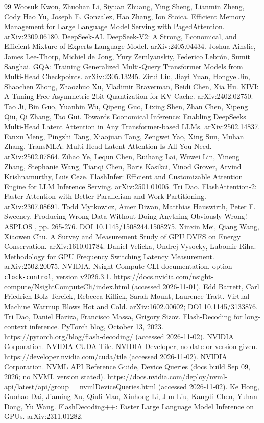 \documentclass[conference]{IEEEtran}
\begin{document}
\begin{thebibliography}{99}
 Woosuk Kwon, Zhuohan Li, Siyuan Zhuang, Ying Sheng, Lianmin Zheng, Cody Hao Yu, Joseph E. Gonzalez, Hao Zhang, Ion Stoica. Efficient Memory Management for Large Language Model Serving with PagedAttention. arXiv:2309.06180.
 DeepSeek-AI. DeepSeek-V2: A Strong, Economical, and Efficient Mixture-of-Experts Language Model. arXiv:2405.04434.
 Joshua Ainslie, James Lee-Thorp, Michiel de Jong, Yury Zemlyanskiy, Federico Lebrón, Sumit Sanghai. GQA: Training Generalized Multi-Query Transformer Models from Multi-Head Checkpoints. arXiv:2305.13245.
 Zirui Liu, Jiayi Yuan, Hongye Jin, Shaochen Zhong, Zhaozhuo Xu, Vladimir Braverman, Beidi Chen, Xia Hu. KIVI: A Tuning-Free Asymmetric 2bit Quantization for KV Cache. arXiv:2402.02750.
 Tao Ji, Bin Guo, Yuanbin Wu, Qipeng Guo, Lixing Shen, Zhan Chen, Xipeng Qiu, Qi Zhang, Tao Gui. Towards Economical Inference: Enabling DeepSeek\textquotesingle s Multi-Head Latent Attention in Any Transformer-based LLMs. arXiv:2502.14837.
 Fanxu Meng, Pingzhi Tang, Xiaojuan Tang, Zengwei Yao, Xing Sun, Muhan Zhang. TransMLA: Multi-Head Latent Attention Is All You Need. arXiv:2502.07864.
 Zihao Ye, Lequn Chen, Ruihang Lai, Wuwei Lin, Yineng Zhang, Stephanie Wang, Tianqi Chen, Baris Kasikci, Vinod Grover, Arvind Krishnamurthy, Luis Ceze. FlashInfer: Efficient and Customizable Attention Engine for LLM Inference Serving. arXiv:2501.01005.
 Tri Dao. FlashAttention-2: Faster Attention with Better Parallelism and Work Partitioning. arXiv:2307.08691.
 Todd Mytkowicz, Amer Diwan, Matthias Hauswirth, Peter F. Sweeney. Producing Wrong Data Without Doing Anything Obviously Wrong! ASPLOS , pp. 265-276. DOI 10.1145/1508244.1508275.
 Xinxin Mei, Qiang Wang, Xiaowen Chu. A Survey and Measurement Study of GPU DVFS on Energy Conservation. arXiv:1610.01784.
 Daniel Velicka, Ondrej Vysocky, Lubomir Riha. Methodology for GPU Frequency Switching Latency Measurement. arXiv:2502.20075.
 NVIDIA. Nsight Compute CLI documentation, option \texttt{-\/-clock-control}, version v2026.3.1. \url{https://docs.nvidia.com/nsight-compute/NsightComputeCli/index.html} (accessed 2026-11-01).
 Edd Barrett, Carl Friedrich Bolz-Tereick, Rebecca Killick, Sarah Mount, Laurence Tratt. Virtual Machine Warmup Blows Hot and Cold. arXiv:1602.00602; DOI 10.1145/3133876.
 Tri Dao, Daniel Haziza, Francisco Massa, Grigory Sizov. Flash-Decoding for long-context inference. PyTorch blog, October 13, 2023. \url{https://pytorch.org/blog/flash-decoding/} (accessed 2026-11-02).
 NVIDIA Corporation. NVIDIA CUDA Tile. NVIDIA Developer, no date or version given. \url{https://developer.nvidia.com/cuda/tile} (accessed 2026-11-02).
 NVIDIA Corporation. NVML API Reference Guide, Device Queries (docs build Sep 09, 2026; no NVML version stated). \url{https://docs.nvidia.com/deploy/nvml-api/latest/api/group__nvmlDeviceQueries.html} (accessed 2026-11-02).
 Ke Hong, Guohao Dai, Jiaming Xu, Qiuli Mao, Xiuhong Li, Jun Liu, Kangdi Chen, Yuhan Dong, Yu Wang. FlashDecoding++: Faster Large Language Model Inference on GPUs. arXiv:2311.01282.
\end{thebibliography}
\end{document}

